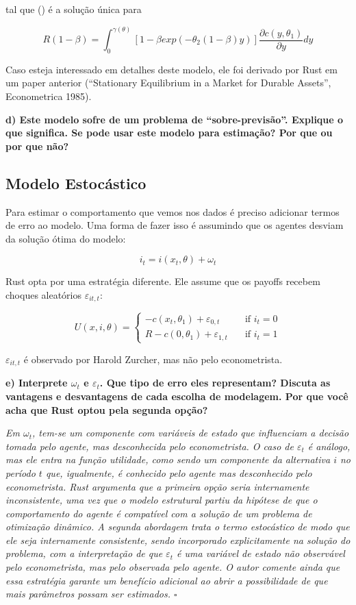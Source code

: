 \documentclass[12pt,a4paper]{article}
\begin{document}
tal que \gamma(\theta) é a solução única para

\[R(1-\beta) = \int_0^{\gamma(\theta)}[1 - \beta exp(-\theta_2(1 - \beta)y)]\frac{\partial c(y,\theta_1)}{\partial y}dy\]

Caso esteja interessado em detalhes deste modelo, ele foi derivado por
Rust em um paper anterior (``Stationary Equilibrium in a Market for
Durable Assets'', Econometrica 1985).

\textbf{d) Este modelo sofre de um problema de ``sobre-previsão''.
Explique o que significa. Se pode usar este modelo para estimação? Por
que ou por que não?}

\hypertarget{modelo-estocastico}{%
\subsection{Modelo Estocástico}\label{modelo-estocastico}}

Para estimar o comportamento que vemos nos dados é preciso adicionar
termos de erro ao modelo. Uma forma de fazer isso é assumindo que os
agentes desviam da solução ótima do modelo:

\[i_t = i(x_t, \theta) + \omega_t\]

Rust opta por uma estratégia diferente. Ele assume que os payoffs
recebem choques aleatórios \(\varepsilon_{it,t}\):

\[ U(x,i,\theta) = 
  \begin{cases}
    -c(x_t,\theta_1) + \varepsilon_{0,t}    & \quad \text{if } i_t=0\\
    R - c(0,\theta_1) + \varepsilon_{1,t}  & \quad \text{if } i_t=1
  \end{cases}
\]

\(\varepsilon_{it,t}\) é observado por Harold Zurcher, mas não pelo
econometrista.

\textbf{e) Interprete \(\omega_t\) e \(\varepsilon_t\). Que tipo de erro
eles representam? Discuta as vantagens e desvantagens de cada escolha de
modelagem. Por que você acha que Rust optou pela segunda opção?}

\emph{Em \(\omega_t\), tem-se um componente com variáveis de estado que
influenciam a decisão tomada pelo agente, mas desconhecida pelo
econometrista. O caso de \(\varepsilon_t\) é análogo, mas ele entra na
função utilidade, como sendo um componente da alternativa \(i\) no
período \(t\) que, igualmente, é conhecido pelo agente mas desconhecido
pelo econometrista. Rust argumenta que a primeira opção seria
internamente inconsistente, uma vez que o modelo estrutural partiu da
hipótese de que o comportamento do agente é compatível com a solução de
um problema de otimização dinâmico. A segunda abordagem trata o termo
estocástico de modo que ele seja internamente consistente, sendo
incorporado explicitamente na solução do problema, com a interpretação
de que \(\varepsilon_t\) é uma variável de estado não observável pelo
econometrista, mas pelo observada pelo agente. O autor comente ainda que
essa estratégia garante um benefício adicional ao abrir a possibilidade
de que mais parâmetros possam ser estimados. \(\square\)}
\end{document}
